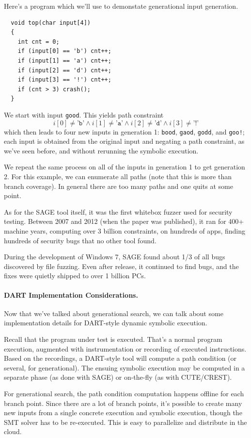 \documentclass[11pt]{article}
\begin{document}
Here's a program which we'll use to demonstate generational input generation.
\begin{lstlisting}
  void top(char input[4])
  {
    int cnt = 0;
    if (input[0] == 'b') cnt++;
    if (input[1] == 'a') cnt++;
    if (input[2] == 'd') cnt++;
    if (input[3] == '!') cnt++;
    if (cnt > 3) crash();
  }
\end{lstlisting}
We start with input \texttt{good}. This yields path constraint
\[
i[0] \neq \texttt{'b'} \wedge i[1] \neq \texttt{'a'} \wedge i[2] \neq \texttt{'d'} \wedge i[3] \neq \texttt{'!'}
\]
which then leads to four new inputs in generation 1: \texttt{bood}, \texttt{gaod}, \texttt{godd}, and \texttt{goo!}; each input is obtained from the
original input and negating a path constraint, as we've seen before, and without rerunning the symbolic execution.

We repeat the same process on all of the inputs in generation 1 to get generation 2. For this example, we can enumerate all paths
(note that this is more than branch coverage). In general there are too many paths and one quits at some point.

As for the SAGE tool itself, it was the first whitebox fuzzer used for security testing. Between 2007 and 2012 (when the paper was published), it
ran for 400+ machine years, computing over 3 billion constraints, on hundreds of apps, finding hundreds of security bugs that no other tool found.

During the development of Windows 7, SAGE found about 1/3 of all bugs discovered by file fuzzing. Even after release, it continued to find bugs,
and the fixes were quietly shipped to over 1 billion PCs.

\paragraph{DART Implementation Considerations.} Now that we've talked about generational search, we can talk about some implementation details for DART-style
dynamic symbolic execution.

Recall that the program under test is executed. That's a normal program execution, augmented with instrumentation or recording of executed instructions.
Based on the recordings, a DART-style tool will compute a path condition (or several, for generational). The ensuing symbolic execution may be computed in a separate phase (as done with SAGE)
or on-the-fly (as with CUTE/CREST).

For generational search, the path condition computation happens offline for each branch point. Since there are a lot of branch points, it's possible to create many new inputs from
a single concrete execution and symbolic execution, though the SMT solver has to be re-executed. This is easy to parallelize and distribute in the cloud.
\end{document}
